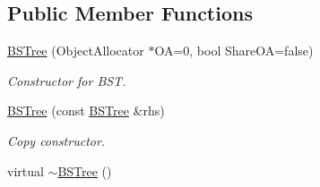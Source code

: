 \subsection*{Public Member Functions}
\begin{DoxyCompactItemize}
\item 
\hyperlink{classBSTree_ab5ad17b82195c7758ebbb9b6f41229e6}{B\-S\-Tree} (Object\-Allocator $\ast$O\-A=0, bool Share\-O\-A=false)
\begin{DoxyCompactList}\small\item\em Constructor for B\-S\-T. \end{DoxyCompactList}\item 
\hyperlink{classBSTree_ac05b0777b5942ea93fe292cbe4c67059}{B\-S\-Tree} (const \hyperlink{classBSTree}{B\-S\-Tree} \&rhs)
\begin{DoxyCompactList}\small\item\em Copy constructor. \end{DoxyCompactList}\item 
\hypertarget{classBSTree_a9e318eddca027a4ca500e6b7c84c749f}{virtual \hyperlink{classBSTree_a9e318eddca027a4ca500e6b7c84c749f}{$\sim$\-B\-S\-Tree} ()}\label{classBSTree_a9e318eddca027a4ca500e6b7c84c749f}


\end{DoxyCompactItemize}
